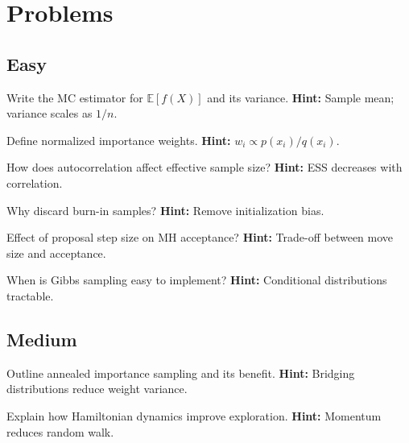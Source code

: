 
\section*{Problems}

\subsection*{Easy}
\begin{problem}[MC Estimator]
Write the MC estimator for $\mathbb{E}[f(X)]$ and its variance.
\textbf{Hint:} Sample mean; variance scales as $1/n$.
\end{problem}

\begin{problem}
Define normalized importance weights.
\textbf{Hint:} $w_i \propto p(x_i)/q(x_i)$.
\end{problem}

\begin{problem}[Autocorrelation]
How does autocorrelation affect effective sample size?
\textbf{Hint:} ESS decreases with correlation.
\end{problem}

\begin{problem}[Burn-in]
Why discard burn-in samples?
\textbf{Hint:} Remove initialization bias.
\end{problem}

\begin{problem}
Effect of proposal step size on MH acceptance?
\textbf{Hint:} Trade-off between move size and acceptance.
\end{problem}

\begin{problem}[Gibbs]
When is Gibbs sampling easy to implement?
\textbf{Hint:} Conditional distributions tractable.
\end{problem}

\subsection*{Medium}
\begin{problem}[AIS]
Outline annealed importance sampling and its benefit.
\textbf{Hint:} Bridging distributions reduce weight variance.
\end{problem}

\begin{problem}
Explain how Hamiltonian dynamics improve exploration.
\textbf{Hint:} Momentum reduces random walk.
\end{problem}

